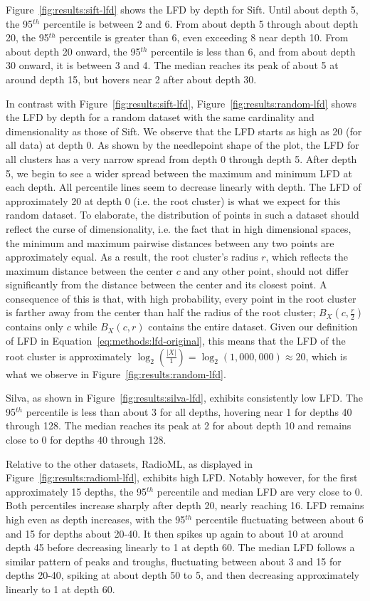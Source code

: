 Figure~\ref{fig:results:sift-lfd} shows the LFD by depth for Sift.
Until about depth 5, the 95$^{th}$ percentile is between 2 and 6.
From about depth 5 through about depth 20, the 95$^{th}$ percentile is greater than 6, even exceeding 8 near depth 10.
From about depth 20 onward, the 95$^{th}$ percentile is less than 6, and from about depth 30 onward, it is between 3 and 4.
The median reaches its peak of about 5 at around depth 15, but hovers near 2 after about depth 30.

In contrast with Figure~\ref{fig:results:sift-lfd}, Figure~\ref{fig:results:random-lfd} shows the LFD by depth for a random dataset with the same cardinality and dimensionality as those of Sift.
We observe that the LFD starts as high as 20 (for all data) at depth 0.
As shown by the needlepoint shape of the plot, the LFD for all clusters has a very narrow spread from depth 0 through depth 5.
After depth 5, we begin to see a wider spread between the maximum and minimum LFD at each depth.
All percentile lines seem to decrease linearly with depth.
The LFD of approximately 20 at depth 0 (i.e. the root cluster) is what we expect for this random dataset.
To elaborate, the distribution of points in such a dataset should reflect the curse of dimensionality, i.e. the fact that in high dimensional spaces, the minimum and maximum pairwise distances between any two points are approximately equal.
As a result, the root cluster's radius $r$, which reflects the maximum distance between the center $c$ and any other point, should not differ significantly from the distance between the center and its closest point.
A consequence of this is that, with high probability, every point in the root cluster is farther away from the center than half the radius of the root cluster;
$B_X(c, \tfrac{r}{2})$ contains only $c$ while $B_X(c, r)$ contains the entire dataset.
Given our definition of LFD in Equation~\ref{eq:methods:lfd-original}, this means that the LFD of the root cluster is approximately $\log_2(\frac{|X|}{1}) = \log_2(1,000,000) \approx 20$, which is what we observe in Figure~\ref{fig:results:random-lfd}.

Silva, as shown in Figure~\ref{fig:results:silva-lfd}, exhibits consistently low LFD.
The 95$^{th}$ percentile is less than about 3 for all depths, hovering near 1 for depths 40 through 128.
The median reaches its peak at 2 for about depth 10 and remains close to 0 for depths 40 through 128.

Relative to the other datasets, RadioML, as displayed in Figure~\ref{fig:results:radioml-lfd}, exhibits high LFD.
Notably however, for the first approximately 15 depths, the 95$^{th}$ percentile and median LFD are very close to 0.
Both percentiles increase sharply after depth 20, nearly reaching 16.
LFD remains high even as depth increases, with the 95$^{th}$ percentile fluctuating between about 6 and 15 for depths about 20-40.
It then spikes up again to about 10 at around depth 45 before decreasing linearly to 1 at depth 60.
The median LFD follows a similar pattern of peaks and troughs, fluctuating between about 3 and 15 for depths 20-40, spiking at about depth 50 to 5, and then decreasing approximately linearly to 1 at depth 60.

